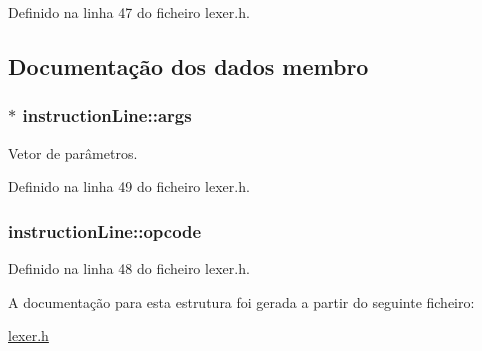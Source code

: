 Definido na linha 47 do ficheiro lexer.\-h.



\subsection{Documentação dos dados membro}
\hypertarget{structinstruction_line_ab6b4be43f89da78d09a9469f952435c7}{
\subsubsection[{args}]{$\ast$ instruction\-Line\-::args}}\label{structinstruction_line_ab6b4be43f89da78d09a9469f952435c7}


Vetor de parâmetros. 



Definido na linha 49 do ficheiro lexer.\-h.

\hypertarget{structinstruction_line_a309feca274873683d12f90cf0bd81780}{
\subsubsection[{opcode}]{ instruction\-Line\-::opcode}}\label{structinstruction_line_a309feca274873683d12f90cf0bd81780}


Definido na linha 48 do ficheiro lexer.\-h.



A documentação para esta estrutura foi gerada a partir do seguinte ficheiro\-:\begin{DoxyCompactItemize}
\item 
\hyperlink{lexer_8h}{lexer.\-h}\end{DoxyCompactItemize}
